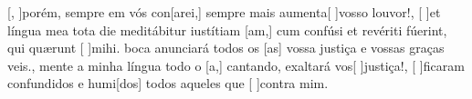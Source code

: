 {    {[, ]{po}rém, sempre em vós con[arei,] sempre mais aumenta[ ]{vos}{so} louvor!},
  {[ ]{et} língua mea tota die meditábitur iustítiam [am,] cum confúsi et revériti fúerint, qui quærunt [ ]{mi}hi.}%
    { boca anunciará todos os [as] vossa justiça e vossas graças veis.},
  {}%
    {mente a minha língua todo o [a,] cantando, exaltará vos[ ]{jus}{ti}ça!},
  {}%
    {[ ]{fi}caram confundidos e humi[dos] todos aqueles que [ ]{con}tra mim.}
}